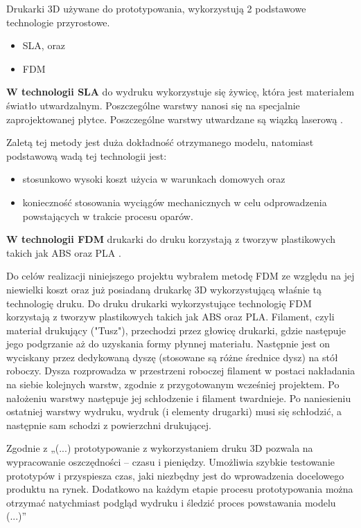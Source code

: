\documentclass[a4paper,12pt,reqno]{article}
\begin{document}
Drukarki 3D używane do prototypowania, wykorzystują 2 podstawowe technologie przyrostowe.
\cite{prototyp3dzalety}
\begin{itemize}
\item SLA, oraz
\item FDM
\end{itemize}
\textbf{W technologii SLA} do wydruku wykorzystuje się żywicę, która jest materiałem światło utwardzalnym. Poszczególne warstwy nanosi się na specjalnie zaprojektowanej płytce. Poszczególne warstwy utwardzane są wiązką laserową \cite{jakie_materialy_w_druku}.

Zaletą tej metody jest duża dokładność otrzymanego modelu, natomiast podstawową wadą tej technologii jest:
\begin{itemize}
\item stosunkowo wysoki koszt użycia w warunkach domowych oraz
\item konieczność stosowania wyciągów mechanicznych w celu odprowadzenia powstających w trakcie procesu oparów.
\end{itemize}

\textbf{W technologii FDM} drukarki do druku korzystają z tworzyw plastikowych takich jak ABS oraz PLA \cite{jak_wybrac_tworzywo_do_drukarek} \cite{jakie_materialy_w_druku}.

Do celów realizacji niniejszego projektu wybrałem metodę FDM ze względu na jej niewielki koszt oraz już posiadaną drukarkę 3D wykorzystującą właśnie tą technologię druku. 
Do druku drukarki wykorzystujące technologię FDM korzystają z tworzyw plastikowych takich jak ABS oraz PLA.
Filament, czyli materiał drukujący ("Tusz"), przechodzi przez głowicę drukarki, gdzie następuje jego podgrzanie aż do uzyskania formy płynnej materiału. 
Następnie jest on wyciskany przez dedykowaną dyszę (stosowane są różne średnice dysz) na stół roboczy. 
Dysza rozprowadza w przestrzeni roboczej filament w postaci nakładania na siebie kolejnych warstw, zgodnie z przygotowanym wcześniej projektem. 
Po nałożeniu warstwy następuje jej schłodzenie i filament twardnieje. 
Po naniesieniu ostatniej warstwy wydruku, wydruk (i elementy drugarki) musi się schłodzić, a następnie sam schodzi z powierzchni drukującej.

Zgodnie z \cite{prototyp3dzalety} „(...) prototypowanie z wykorzystaniem druku 3D pozwala na wypracowanie oszczędności – czasu i pieniędzy. Umożliwia szybkie testowanie prototypów i przyspiesza czas, jaki niezbędny jest do wprowadzenia docelowego produktu na rynek. Dodatkowo na każdym etapie procesu prototypowania można otrzymać natychmiast podgląd wydruku i śledzić proces powstawania modelu (...)”
\end{document}
